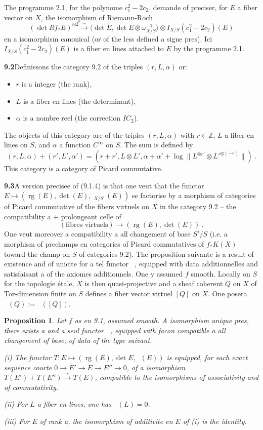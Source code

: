 \documentclass[12pt,a4paper]{article}
\theoremstyle{plain}
\newtheorem{proposition}[theorem]{Proposition}
\theoremstyle{definition}
\theoremstyle{remark}
\newcommand{\bbZ}{\mathbb{Z}}
\DeclareMathOperator{\rg}{rg}
\DeclareMathOperator{\ICtwo}{IC_2}
\newcommand{\ubK}{\underline{K}}
\newcommand{\simto}{\xrightarrow{\sim}}
\begin{document}
The programme 2.1, for the polynome $c_1^2 - 2c_2$, demande of preciser, for $E$ a fiber vector on $X$, the isomorphism of Riemann-Roch
\begin{equation}
\label{eq:9.1.1}
(\det Rf_* E)^{\otimes 2} \simto \langle \det E, \det E \otimes \omega_{X/S}^{-1} \rangle \otimes I_{X/S}(c_1^2 - 2c_2)(E)
\end{equation}
en a isomorphism canonical (or of the less defined a signe pres). Ici $I_{X/S}(c_1^2 - 2c_2)(E)$ is a fiber en lines attached to $E$ by the programme 2.1.

\medskip
\noindent\textbf{9.2}\quad Definissons the category 9.2 of the triples $(r, L, \alpha)$ or:
\begin{itemize}
\item $r$ is a integer (the rank),
\item $L$ is a fiber en lines (the determinant),
\item $\alpha$ is a nombre reel (the correction $IC_2$).
\end{itemize}
The objects of this category are of the triples $(r, L, \alpha)$ with $r \in \bbZ$, $L$ a fiber en lines on $S$, and $\alpha$ a function $C^\infty$ on $S$. The sum is defined by
\[
(r, L, \alpha) + (r', L', \alpha') = (r+r', L \otimes L', \alpha + \alpha' + \log\|L^{\otimes r'} \otimes L'^{\otimes (-r)}\|) \ .
\]
This category is a category of Picard commutative.

\medskip
\noindent\textbf{9.3}\quad A version precisee of (9.1.4) is that one veut that the functor $E \mapsto (\rg(E), \det(E), \ICtwo_{X/S}(E))$ se factorise by a morphism of categories of Picard commutative of the fibers virtuels on $X$ in the category 9.2 -- the compatibility a $+$ prolongeant celle of
\[
(\text{fibres virtuels}) \longrightarrow (\rg(E), \det(E)) \ .
\]
One veut moreover a compatibility a all changement of base $S'/S$ (i.e. a morphism of prechamps en categories of Picard commutatives of $f_*\ubK(X)$ toward the champ on $S$ of categories 9.2). The proposition suivante is a result of existence and of unicite for a tel functor $\ICtwo$, equipped with data additionnelles and satisfaisant a of the axiomes additionnels. One y assumed $f$ smooth. Locally on $S$ for the topologie étale, $X$ is then quasi-projective and a sheaf coherent $Q$ on $X$ of Tor-dimension finite on $S$ defines a fiber vector virtuel $[Q]$ on $X$. One posera $\ICtwo(Q) := \ICtwo([Q])$.

\begin{proposition}
Let $f$ as en 9.1, assumed smooth. A isomorphism unique pres, there exists a and a seul functor $\ICtwo$, equipped with facon compatible a all changement of base, of data of the type suivant.

\emph{(i)} The functor $T: E \longmapsto (\rg(E), \det E, \ICtwo(E))$ is equipped, for each exact sequence courte $0 \to E' \to E \to E'' \to 0$, of a isomorphism $T(E') + T(E'') \simto T(E)$, compatible to the isomorphisms of associativity and of commutativity.

\emph{(ii)} For $L$ a fiber en lines, one has $\ICtwo(L) = 0$.

\emph{(iii)} For $E$ of rank a, the isomorphism of additivite en $E$ of (i) is the identity.
\end{proposition}
\end{document}
